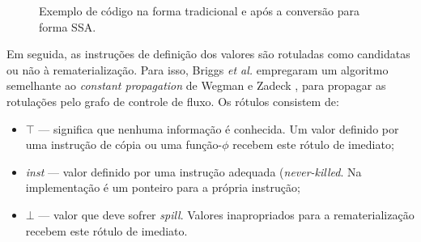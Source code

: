 \documentclass[
	12pt,				%
	openright,			%
	oneside,			%
	a4paper,			%
	tccpreliminar,			%
	]{ABNT-DC-UEL}
\begin{document}
\begin{figure}[hbt]
\begin{subfigure}{0.40\textwidth}
{}
    \end{subfigure}
    \caption{Exemplo de código na forma tradicional e após a conversão para forma SSA.}
    \label{fig:ssa}
\end{figure}

Em seguida, as instruções de definição dos valores são rotuladas como candidatas ou não à rematerialização. Para isso, Briggs \textit{et al.} empregaram um algoritmo semelhante ao \textit{constant propagation} de Wegman e Zadeck \cite{wegman:91}, para propagar as rotulações pelo grafo de controle de fluxo. Os rótulos consistem de:
\begin{itemize}
    \item $\top$ --- significa que nenhuma informação é conhecida. Um valor definido por uma instrução de cópia ou uma função-$\phi$ recebem este rótulo de imediato;
    \item \textit{inst} --- valor definido por uma instrução adequada (\textit{never-killed}. Na implementação é um ponteiro para a própria instrução;
    \item $\bot$ --- valor que deve sofrer \textit{spill}. Valores inapropriados para a rematerialização recebem este rótulo de imediato.
\end{itemize}
\end{document}
